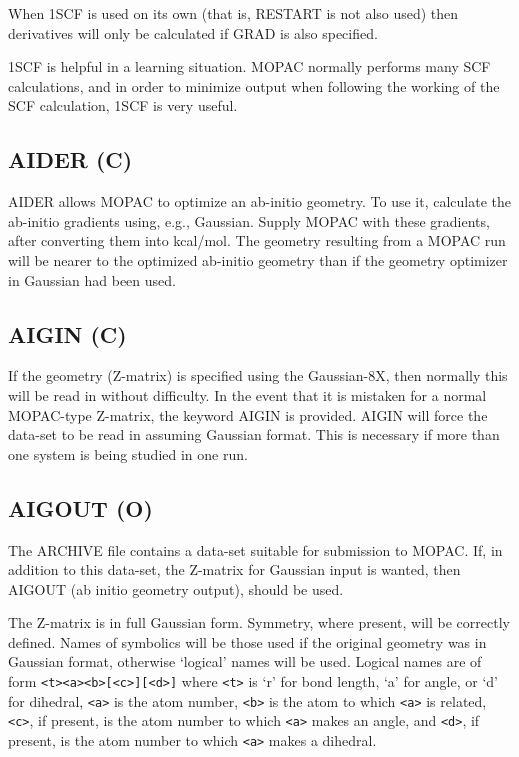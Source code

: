 \documentclass[11pt]{book}
\newcommand{\mi}[1]{#1\index{#1}}
\begin{document}
      When 1SCF is used on its own (that is, RESTART  is  not  also  used)
 then derivatives will only be calculated if GRAD is also specified.

      1SCF is helpful in a learning situation.   MOPAC  normally  performs
 many SCF calculations, and in order to minimize output when following the
 working of the SCF calculation, 1SCF is very useful.

\subsection*{AIDER (C)}
 \mi{AIDER} allows MOPAC to optimize an ab-initio geometry.   To  use  it,
 calculate  the  ab-initio  gradients using, e.g., Gaussian.  Supply MOPAC
 with these gradients, after converting them into kcal/mol.  The  geometry
 resulting  from  a  MOPAC  run  will be nearer to the optimized ab-initio
 geometry than if the geometry optimizer in Gaussian had been used.
 
 
\subsection*{AIGIN (C)}
      If the geometry (Z-matrix) is specified using the Gaussian-8X,  then
 normally  this  will be read in without difficulty.  In the event that it
 is mistaken for a  normal  MOPAC-type  Z-matrix,  the  keyword  AIGIN  is
 provided. \mi{AIGIN} will force the data-set to be read in assuming Gaussian
 format.  This is necessary if more than one system is  being  studied  in
 one run.

\subsection*{AIGOUT (O)}
     The ARCHIVE file contains a  data-set  suitable  for  submission  to
MOPAC.  If, in addition to this data-set, the Z-matrix for Gaussian input
is wanted, then \mi{AIGOUT} (ab initio geometry output), should be used.

     The Z-matrix is in full Gaussian  form.   Symmetry,  where  present,
will  be correctly defined.  Names of symbolics will be those used if the
original geometry was in Gaussian format, otherwise `logical' names  will
be  used.  Logical names are of form \verb/<t><a><b>[<c>][<d>]/ 
where \verb/<t>/ is `r'
for bond length, `a' for angle, or `d' for  dihedral, \verb/<a>/ is the atom
number, \verb/<b>/ is the atom to which \verb/<a>/ is related, \verb/<c>/, 
if present, is the atom number to which \verb/<a>/ makes an angle, 
and \verb/<d>/, if present, is the atom
number to which \verb/<a>/ makes a dihedral.
\end{document}
